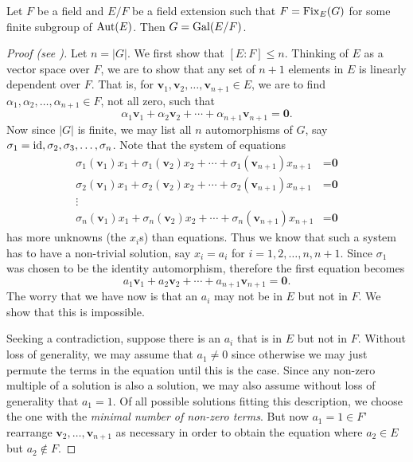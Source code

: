 \begin{theorem}\label{thrm-subgroup-of-automorphisms-equals-galois-group-if-base-field-is-fixed-field}
    Let $F$ be a field and $E/F$ be a field extension such that $F = \mathrm{Fix}_{E}(G)$ for some finite subgroup of $\mathrm{Aut}(E)$. Then $G = \mathrm{Gal}(E/F)$.
\end{theorem}
\begin{proof}[Proof (see {\cite[Theorem 14]{artin_1971}})]
    Let $n = |G|$. We first show that $[E:F] \leq n$. Thinking of $E$ as a vector space over $F$, we are to show that any set of $n + 1$ elements in $E$ is linearly dependent over $F$. That is, for $\textbf{v}_1, \textbf{v}_2, \dots, \textbf{v}_{n+1} \in E$, we are to find $\alpha_1, \alpha_2, \dots, \alpha_{n+1} \in F$, not all zero, such that
    \[
        \alpha_1\textbf{v}_1 + \alpha_2\textbf{v}_2 + \cdots + \alpha_{n+1}\textbf{v}_{n+1} = \textbf{0}.
    \]
    Now since $|G|$ is finite, we may list all $n$ automorphisms of $G$, say $\sigma_1 = \mathrm{id}, \sigma_2, \sigma_3, \dots, \sigma_n$. Note that the system of equations
    \begin{equation}\label{eqn:thrm-subgroup-of-automorphisms-equals-galois-group-if-base-field-is-fixed-field-A}
        \begin{split}
            \sigma_1(\textbf{v}_1)x_1 + \sigma_1(\textbf{v}_2)x_2 + \cdots + \sigma_1(\textbf{v}_{n+1})x_{n+1} &= \textbf{0}\\
            \sigma_2(\textbf{v}_1)x_1 + \sigma_2(\textbf{v}_2)x_2 + \cdots + \sigma_2(\textbf{v}_{n+1})x_{n+1} &= \textbf{0}\\
            \vdots\\
            \sigma_n(\textbf{v}_1)x_1 + \sigma_n(\textbf{v}_2)x_2 + \cdots + \sigma_n(\textbf{v}_{n+1})x_{n+1} &= \textbf{0}
        \end{split}
        \tag{A}
    \end{equation}
    has more unknowns (the $x_i$s) than equations. Thus we know that such a system has to have a non-trivial solution, say $x_i = a_i$ for $i = 1, 2, \dots, n, n+1$. Since $\sigma_1$ was chosen to be the identity automorphism, therefore the first equation becomes
    \[
        a_1\textbf{v}_1 + a_2\textbf{v}_2 + \cdots + a_{n+1}\textbf{v}_{n+1} = \textbf{0}.
    \]
    The worry that we have now is that an $a_i$ may not be in $E$ but not in $F$. We show that this is impossible.

    Seeking a contradiction, suppose there is an $a_i$ that is in $E$ but not in $F$. Without loss of generality, we may assume that $a_1 \neq 0$ since otherwise we may just permute the terms in the equation until this is the case. Since any non-zero multiple of a solution is also a solution, we may also assume without loss of generality that $a_1 = 1$. Of all possible solutions fitting this description, we choose the one with the \textit{minimal number of non-zero terms}. But now $a_1 = 1 \in F$' rearrange $\textbf{v}_2, \dots, \textbf{v}_{n+1}$ as necessary in order to obtain the equation where $a_2 \in E$ but $a_2 \notin F$.


\end{proof}
